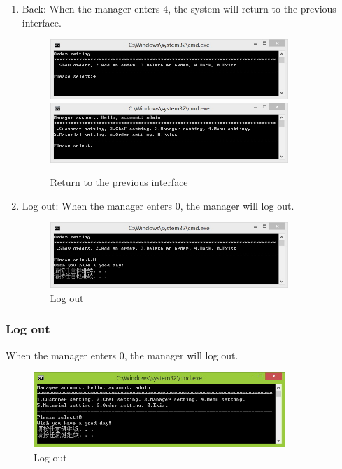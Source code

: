 \documentclass{article}
\begin{document}
\begin{enumerate}
    \item Back:\newline 
    When the manager enters 4, the system will return to the previous interface.
        \begin{figure}[H]
        \centering
        \includegraphics[width=0.85\textwidth]{F/F4a.jpg}
        \includegraphics[width=0.85\textwidth]{F/F4b.jpg}
        \caption{Return to the previous interface}
        \end{figure}
    
    \item Log out:\newline 
    When the manager enters 0, the manager will log out.
        \begin{figure}[H]
        \centering
        \includegraphics[width=0.85\textwidth]{F/F0.jpg}
        \caption{Log out}
        \end{figure}
    
\end{enumerate}


\subsubsection{Log out}
When the manager enters 0, the manager will log out.
\begin{figure}[H]
    \centering
    \includegraphics[width=0.85\textwidth]{login/adminexit.jpg}
    \caption{Log out}
\end{figure}
\end{document}
